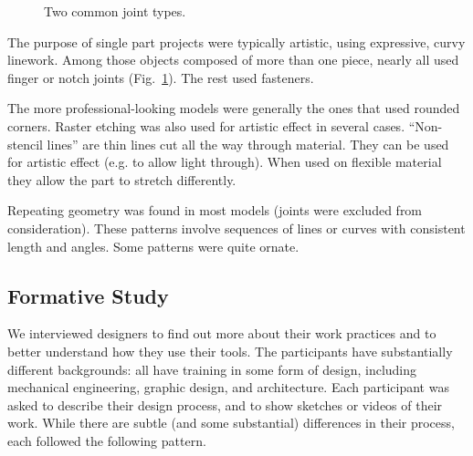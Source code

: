 \documentclass{article}
\begin{document}
\begin{figure}[h]
\centering 
{}
\caption{Two common joint types.}
\label{fig:joint}
\end{figure}

The purpose of single part projects were typically artistic, using
expressive, curvy linework. Among those objects composed of more than
one piece, nearly all used finger or notch joints
(Fig.~\ref{fig:joint}). The rest used fasteners.

The more professional-looking models were generally the ones that used
rounded corners. Raster etching was also used for artistic effect in
several cases. ``Non-stencil lines'' are thin lines cut all the way
through material. They can be used for artistic effect (e.g. to allow
light through). When used on flexible material they allow the part to
stretch differently.

Repeating geometry was found in most models (joints were excluded from
consideration). These patterns involve sequences of lines or curves
with consistent length and angles. Some patterns were quite ornate.

\subsection{Formative Study}
\label{sec:formative}

We interviewed designers to find out more about their work practices
and to better understand how they use their tools. The participants
have substantially different backgrounds: all have training in some
form of design, including mechanical engineering, graphic design, and
architecture. Each participant was asked to describe their design
process, and to show sketches or videos of their work. While there are
subtle (and some substantial) differences in their process, each
followed the following pattern.
\end{document}
